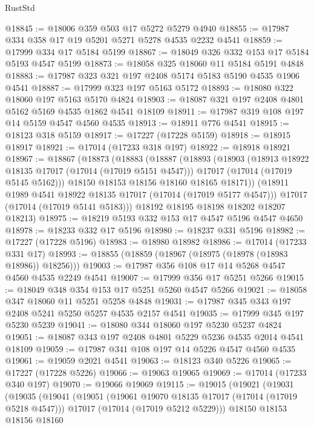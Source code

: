 \begin{lexlean}{RustStd}
\begin{coremodule}
{\begin{coremodule}
{{{{{{{{{{{{{{{{{{{{{{{{{{{{{{{{{{{{{{{{{{{{{{{{{{{{{{{@18845 := @18006 @359 @503 @17 @5272 @5279 @4940
@18855 := @17987 @334 @358 @17 @19 @5201 @5271 @5278 @4535 @2232 @4541
@18859 := @17999 @334 @17 @5184 @5199
@18867 := @18049 @326 @332 @153 @17 @5184 @5193 @4547 @5199
@18873 := @18058 @325 @18060 @11 @5184 @5191 @4848
@18883 := @17987 @323 @321 @197 @2408 @5174 @5183 @5190 @4535 @1906 @4541
@18887 := @17999 @323 @197 @5163 @5172
@18893 := @18080 @322 @18060 @197 @5163 @5170 @4824
@18903 := @18087 @321 @197 @2408 @4801 @5162 @5169 @4535 @1862 @4541 @18109
@18911 := @17987 @319 @108 @197 @14 @5159 @4547 @4560 @4535
@18913 := @18911 @776 @4541
@18915 := @18123 @318 @5159
@18917 := @17227 (@17228 @5159)
@18918 := @18915 @18917
@18921 := @17014 (@17233 @318 @197)
@18922 := @18918 @18921
@18967 := @18867
    (@18873
      (@18883
        (@18887
          (@18893
            (@18903
              (@18913 @18922 @18135 @17017 (@17014 (@17019 @5151 @4547)))
              @17017
              (@17014 (@17019 @5145 @5162)))
            @18150
            @18153
            @18156
            @18160
            @18165
            @18171))
        (@18911 @1989 @4541 @18922 @18135 @17017 (@17014 (@17019 @5177 @4547)))
        @17017
        (@17014 (@17019 @5141 @5183)))
      @18192
      @18195
      @18198
      @18202
      @18207
      @18213)
@18975 := @18219 @5193 @332 @153 @17 @4547 @5196 @4547 @4650
@18978 := @18233 @332 @17 @5196
@18980 := @18237 @331 @5196
@18982 := @17227 (@17228 @5196)
@18983 := @18980 @18982
@18986 := @17014 (@17233 @331 @17)
@18993 := @18855 (@18859 (@18967 (@18975 (@18978 (@18983 @18986)) @18256)))
@19003 := @17987 @356 @108 @17 @14 @5268 @4547 @4560 @4535 @2249 @4541
@19007 := @17999 @356 @17 @5251 @5266
@19015 := @18049 @348 @354 @153 @17 @5251 @5260 @4547 @5266
@19021 := @18058 @347 @18060 @11 @5251 @5258 @4848
@19031 := @17987 @345 @343 @197 @2408 @5241 @5250 @5257 @4535 @2157 @4541
@19035 := @17999 @345 @197 @5230 @5239
@19041 := @18080 @344 @18060 @197 @5230 @5237 @4824
@19051 := @18087 @343 @197 @2408 @4801 @5229 @5236 @4535 @2014 @4541 @18109
@19059 := @17987 @341 @108 @197 @14 @5226 @4547 @4560 @4535
@19061 := @19059 @2021 @4541
@19063 := @18123 @340 @5226
@19065 := @17227 (@17228 @5226)
@19066 := @19063 @19065
@19069 := @17014 (@17233 @340 @197)
@19070 := @19066 @19069
@19115 := @19015
    (@19021
      (@19031
        (@19035
          (@19041
            (@19051
              (@19061 @19070 @18135 @17017 (@17014 (@17019 @5218 @4547)))
              @17017
              (@17014 (@17019 @5212 @5229)))
            @18150
            @18153
            @18156
            @18160
}}}}}}}}}}}}}}}}}}}}}}}}}}}}}}}}}}}}}}}}}}}}}}}}}}}}}}}
\end{coremodule}}
\end{coremodule}
\end{lexlean}
